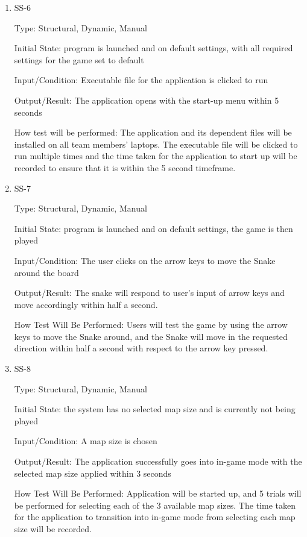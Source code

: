 \documentclass[12pt, titlepage]{article}
\begin{document}
\begin{enumerate}				
\item SS-6
\label{nfr:ss-6}

Type: Structural, Dynamic, Manual

Initial State: program is launched and on default settings, with all required settings for the game set to default

Input/Condition: Executable file for the application is clicked to run

Output/Result: The application opens with the start-up menu within 5 seconds 

How test will be performed: The application and its dependent files will be installed on all team members' laptops. The executable file will be clicked to run multiple times and the time taken for the application to start up will be recorded to ensure that it is within the 5 second timeframe.

\item SS-7
\label{nfr:ss-7}

Type: Structural, Dynamic, Manual

Initial State: program is launched and on default settings, the game is then played

Input/Condition: The user clicks on the arrow keys to move the Snake around the board

Output/Result: The snake will respond to user's input of arrow keys and move accordingly within half a second.

How Test Will Be Performed: Users will test the game by using the arrow keys to move the Snake around, and the Snake will move in the requested direction within half a second with respect to the arrow key pressed.


\item SS-8
\label{nfr:ss-8}

Type: Structural, Dynamic, Manual

Initial State: the system has no selected map size and is currently not being played

Input/Condition: A map size is chosen

Output/Result: The application successfully goes into in-game mode with the selected map size applied within 3 seconds

How Test Will Be Performed: Application will be started up, and 5 trials will be performed for selecting each of the 3 available map sizes. The time taken for the application to transition into in-game mode from selecting each map size will be recorded.


\end{enumerate}
\end{document}
